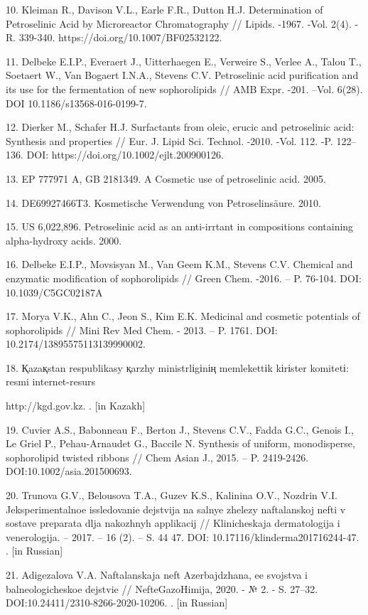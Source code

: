 \begin{noparindent}
10. Kleiman R., Davison V.L., Earle F.R., Dutton H.J. Determination of
Petroselinic Acid by Microreactor Chromatography // Lipids. -1967. -Vol.
2(4). - R. 339-340. https://doi.org/10.1007/BF02532122.

11. Delbeke E.I.P., Everaert J., Uitterhaegen E., Verweire S., Verlee
A., Talou T., Soetaert W., Van Bogaert I.N.A., Stevens C.V. Petroselinic
acid purification and its use for the fermentation of new sophorolipids
// AMB Expr. -201. --Vol. 6(28). DOI 10.1186/s13568-016-0199-7.

12. Dierker M., Schafer H.J. Surfactants from oleic, erucic and
petroselinic acid: Synthesis and properties // Eur. J. Lipid Sci.
Technol. -2010. -Vol. 112. -P. 122--136. DOI:
https://doi.org/10.1002/ejlt.200900126.

13. EP 777971 A, GB 2181349. A Cosmetic use of petroselinic acid. 2005.

14. DE69927466T3. Kosmetische Verwendung von Petroselinsäure. 2010.

15. US 6,022,896. Petroselinic acid as an anti-irrtant in compositions
containing alpha-hydroxy acids. 2000.

16. Delbeke E.I.P., Movsisyan M., Van Geem K.M., Stevens C.V. Chemical
and enzymatic modification of sophorolipids // Green Chem. -2016. -- P.
76-104. DOI: 10.1039/C5GC02187A

17. Morya V.K., Ahn C., Jeon S., Kim E.K. Medicinal and cosmetic
potentials of sophorolipids // Mini Rev Med Chem. - 2013. -- P. 1761.
DOI: 10.2174/13895575113139990002.

18. Қazaқstan respublikasy қarzhy ministrlіgіnің memlekettіk kіrіster
komitetі: resmi internet-resurs

http://kgd.gov.kz. . {[}in Kazakh{]}

19. Cuvier A.S., Babonneau F., Berton J., Stevens C.V., Fadda G.C.,
Genois I., Le Griel P., Pehau-Arnaudet G., Baccile N. Synthesis of
uniform, monodisperse, sophorolipid twisted ribbons // Chem Asian J.,
2015. -- P. 2419-2426. DOI:10.1002/asia.201500693.

20. Trunova G.V., Belousova T.A., Guzev K.S., Kalinina O.V., Nozdrin
V.I. Jeksperimental\textquotesingle noe issledovanie dejstvija na
sal\textquotesingle nye zhelezy naftalanskoj nefti v sostave preparata
dlja nakozhnyh applikacij // Klinicheskaja dermatologija i venerologija.
-- 2017. -- 16 (2). -- S. 44 47. DOI: 10.17116/klinderma201716244-47. .
{[}in Russian{]}

21. Adigezalova V.A. Naftalanskaja neft\textquotesingle{} Azerbajdzhana,
ee svojstva i bal\textquotesingle neologicheskoe dejstvie //
NefteGazoHimija, 2020. - № 2. - S. 27--32.
DOI:10.24411/2310-8266-2020-10206. . {[}in Russian{]}
\end{noparindent}

